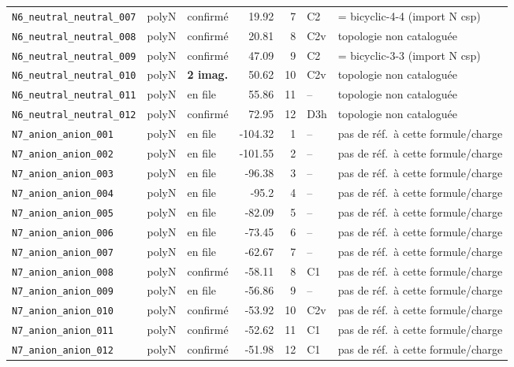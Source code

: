 \begin{longtable}{@{}p{4.2cm}cp{1.3cm}rrp{1.2cm}p{2.6cm}@{}}
\texttt{N6\_neutral\_neutral\_007} & polyN & confirm\'e & 19.92 & 7 & C2 & = bicyclic-4-4 (import N csp) \\
\texttt{N6\_neutral\_neutral\_008} & polyN & confirm\'e & 20.81 & 8 & C2v & topologie non catalogu\'ee \\
\texttt{N6\_neutral\_neutral\_009} & polyN & confirm\'e & 47.09 & 9 & C2 & = bicyclic-3-3 (import N csp) \\
\texttt{N6\_neutral\_neutral\_010} & polyN & \textbf{2 imag.} & 50.62 & 10 & C2v & topologie non catalogu\'ee \\
\texttt{N6\_neutral\_neutral\_011} & polyN & en file & 55.86 & 11 & -- & topologie non catalogu\'ee \\
\texttt{N6\_neutral\_neutral\_012} & polyN & confirm\'e & 72.95 & 12 & D3h & topologie non catalogu\'ee \\
\addlinespace
\texttt{N7\_anion\_anion\_001} & polyN & en file & -104.32 & 1 & -- & pas de r\'ef.\ \`a cette formule/charge \\
\texttt{N7\_anion\_anion\_002} & polyN & en file & -101.55 & 2 & -- & pas de r\'ef.\ \`a cette formule/charge \\
\texttt{N7\_anion\_anion\_003} & polyN & en file & -96.38 & 3 & -- & pas de r\'ef.\ \`a cette formule/charge \\
\texttt{N7\_anion\_anion\_004} & polyN & en file & -95.2 & 4 & -- & pas de r\'ef.\ \`a cette formule/charge \\
\texttt{N7\_anion\_anion\_005} & polyN & en file & -82.09 & 5 & -- & pas de r\'ef.\ \`a cette formule/charge \\
\texttt{N7\_anion\_anion\_006} & polyN & en file & -73.45 & 6 & -- & pas de r\'ef.\ \`a cette formule/charge \\
\texttt{N7\_anion\_anion\_007} & polyN & en file & -62.67 & 7 & -- & pas de r\'ef.\ \`a cette formule/charge \\
\texttt{N7\_anion\_anion\_008} & polyN & confirm\'e & -58.11 & 8 & C1 & pas de r\'ef.\ \`a cette formule/charge \\
\texttt{N7\_anion\_anion\_009} & polyN & en file & -56.86 & 9 & -- & pas de r\'ef.\ \`a cette formule/charge \\
\texttt{N7\_anion\_anion\_010} & polyN & confirm\'e & -53.92 & 10 & C2v & pas de r\'ef.\ \`a cette formule/charge \\
\texttt{N7\_anion\_anion\_011} & polyN & confirm\'e & -52.62 & 11 & C1 & pas de r\'ef.\ \`a cette formule/charge \\
\texttt{N7\_anion\_anion\_012} & polyN & confirm\'e & -51.98 & 12 & C1 & pas de r\'ef.\ \`a cette formule/charge \\

\end{longtable}
